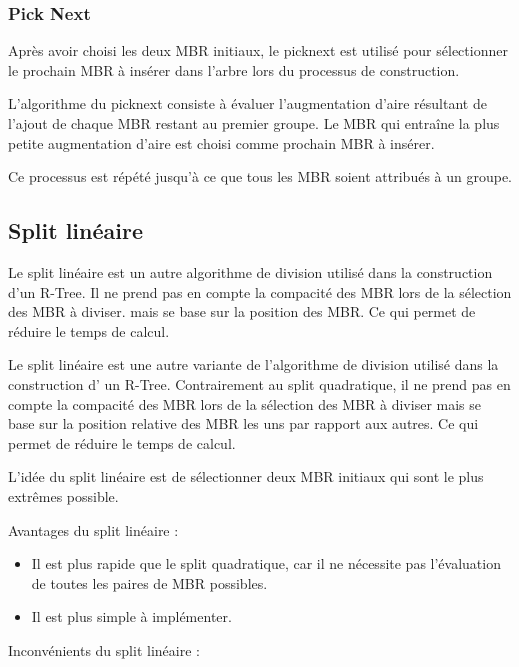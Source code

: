 \documentclass {article}
\begin{document}
\subsubsection {Pick Next}

Après avoir choisi les deux MBR initiaux, le picknext est utilisé pour sélectionner le prochain MBR 
à insérer dans l'arbre lors du processus de construction.

L'algorithme du picknext consiste à évaluer l'augmentation d'aire résultant de l'ajout de chaque MBR 
restant au premier groupe. Le MBR qui entraîne la plus petite augmentation d'aire est choisi 
comme prochain MBR à insérer.

Ce processus est répété jusqu'à ce que tous les MBR soient attribués à un groupe.





\subsection {Split linéaire}

Le split linéaire est un autre algorithme de division utilisé dans la construction d'un R-Tree. 
Il ne prend pas en compte la compacité des MBR lors de la sélection des MBR à diviser.
mais se base sur la position des MBR. Ce qui permet de réduire le temps de calcul.

Le split linéaire est une autre variante de l'algorithme de division utilisé dans la construction d'
un R-Tree. 
Contrairement au split quadratique, il ne prend pas en compte la compacité des MBR lors de la 
sélection des MBR à diviser mais se base sur la position relative des MBR les uns par rapport 
aux autres. 
Ce qui permet de réduire le temps de calcul.

L'idée du split linéaire est de sélectionner deux MBR initiaux qui sont le plus extrêmes possible.

Avantages du split linéaire :

\begin{itemize}
    \item Il est plus rapide que le split quadratique, car il ne nécessite pas l'évaluation de
	toutes les paires de MBR possibles.
    \item Il est plus simple à implémenter.

\end{itemize}
Inconvénients du split linéaire :
\end{document}
